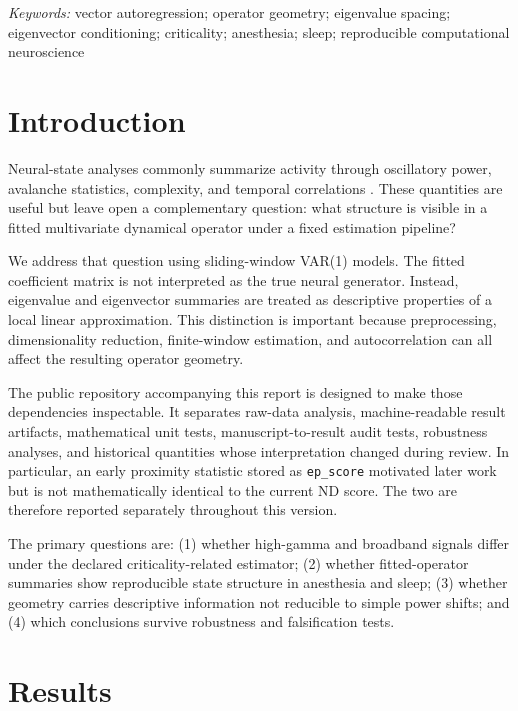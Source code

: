 \documentclass[preprint,12pt,nonatbib]{elsarticle}
\begin{document}
\textit{Keywords:} vector autoregression; operator geometry; eigenvalue spacing; eigenvector conditioning; criticality; anesthesia; sleep; reproducible computational neuroscience

\section{Introduction}
Neural-state analyses commonly summarize activity through oscillatory power, avalanche statistics, complexity, and temporal correlations \citep{Beggs2003,Hardstone2012,Lombardi2023}. These quantities are useful but leave open a complementary question: what structure is visible in a fitted multivariate dynamical operator under a fixed estimation pipeline?

We address that question using sliding-window VAR(1) models. The fitted coefficient matrix is not interpreted as the true neural generator. Instead, eigenvalue and eigenvector summaries are treated as descriptive properties of a local linear approximation. This distinction is important because preprocessing, dimensionality reduction, finite-window estimation, and autocorrelation can all affect the resulting operator geometry.

The public repository accompanying this report is designed to make those dependencies inspectable. It separates raw-data analysis, machine-readable result artifacts, mathematical unit tests, manuscript-to-result audit tests, robustness analyses, and historical quantities whose interpretation changed during review. In particular, an early proximity statistic stored as \texttt{ep\_score} motivated later work but is not mathematically identical to the current ND score. The two are therefore reported separately throughout this version.

The primary questions are: (1) whether high-gamma and broadband signals differ under the declared criticality-related estimator; (2) whether fitted-operator summaries show reproducible state structure in anesthesia and sleep; (3) whether geometry carries descriptive information not reducible to simple power shifts; and (4) which conclusions survive robustness and falsification tests.

\section{Results}
\end{document}
